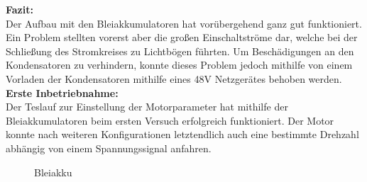 \textbf{Fazit:}
\\[2mm]
Der Aufbau mit den Bleiakkumulatoren hat vorübergehend ganz gut funktioniert. Ein Problem stellten vorerst aber die großen Einschaltströme dar, welche bei der Schließung des Stromkreises zu Lichtbögen führten. Um Beschädigungen an den Kondensatoren zu verhindern, konnte dieses Problem jedoch mithilfe von einem Vorladen der Kondensatoren mithilfe eines 48V Netzgerätes behoben werden.
\\[5mm]

\textbf{Erste Inbetriebnahme:}
\\[2mm]
Der Teslauf zur Einstellung der Motorparameter hat mithilfe der Bleiakkumulatoren beim ersten Versuch erfolgreich funktioniert. Der Motor konnte nach weiteren Konfigurationen letztendlich auch eine bestimmte Drehzahl abhängig von einem Spannungssignal anfahren. 


\begin{figure}[H]
	\begin{center}
		\caption{Bleiakku}
	\end{center}
\end{figure}

\newpage

